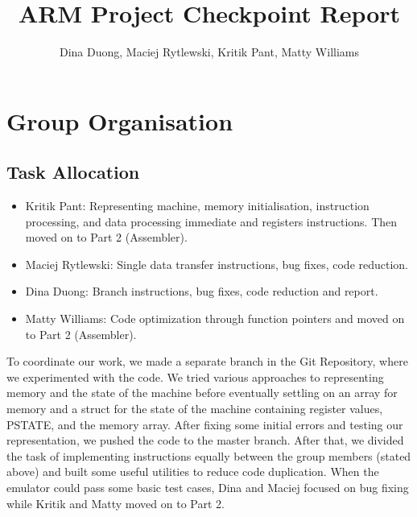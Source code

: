 \documentclass[11pt]{article}
\begin{document}
\title{
    \vspace{-2cm}
    ARM Project Checkpoint Report}
\author{Dina Duong, Maciej Rytlewski, Kritik Pant, Matty Williams}

\maketitle

\section{Group Organisation}

\subsection*{Task Allocation}

\begin{itemize}
    \item Kritik Pant: Representing machine, memory initialisation, instruction processing, and data processing immediate and registers instructions. 
    Then moved on to Part 2 (Assembler).
    \item Maciej Rytlewski: Single data transfer instructions, bug fixes, code reduction.
    \item Dina Duong: Branch instructions, bug fixes, code reduction and report. 
    \item Matty Williams: Code optimization through function pointers and moved on to Part 2 (Assembler).
\end{itemize}
To coordinate our work, we made a separate branch in the Git Repository, where we experimented with the code. 
We tried various approaches to representing memory and the state of the machine before eventually settling on an array for memory and a 
struct for the state of the machine containing register values, PSTATE, and the memory array. 
After fixing some initial errors and testing our representation, we pushed the code to the master branch.
After that, we divided the task of implementing instructions equally between the group members (stated above) and built some useful utilities to reduce code duplication.
When the emulator could pass some basic test cases, Dina and Maciej focused on bug fixing while Kritik and Matty moved on to Part 2.
\end{document}
